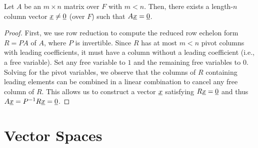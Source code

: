 \begin{lemma}
\label{lemma:widematrix_has_nullvector}
Let $A$ be an $m \times n$ matrix over $F$ with $m<n$.
Then, there exists a length-$n$ column vector $\underline{x} \neq \underline{0}$ (over $F$) such that $A \underline{x} = \underline{0}$.
\end{lemma}
\begin{proof}
First, we use row reduction to compute the reduced row echelon form $R=PA$ of $A$, where $P$ is invertible.
Since $R$ has at most $m<n$ pivot columns with leading coefficients, it must have a column without a leading coefficient (i.e., a free variable).
Set any free variable to $1$ and the remaining free variables to $0$.
Solving for the pivot variables, we observe that the columns of $R$ containing leading elements can be combined in a linear combination to cancel any free column of $R$.
This allows us to construct a vector $\underline{x}$ satisfying $R\underline{x}=\underline{0}$ and thus $A \underline{x} = P^{-1} R \underline{x} = \underline{0}$.
\end{proof}


\section{Vector Spaces}

